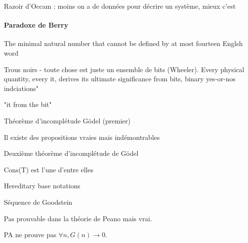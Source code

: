 \begin{definition}
Razoir d'Occam : moins on a de données pour décrire un système, mieux c'est
\end{definition}


\paragraph{Paradoxe de Berry} The minimal natural number that cannot be defined by at most fourteen Englsh word
\begin{definition}
Trous noirs - toute chose est juste un ensemble de bits (Wheeler). Every physical quantity, every it, derives its ultimate significance from bits, binary yes-or-nos indciations"
\par "it from the bit"
\end{definition}

\begin{theorem}
Théorème d'incomplétude Gödel (premier)
\par Il existe des propositions vraies mais indémontrables
\end{theorem}

\begin{theorem}
Deuxième théorème d'incomplétude de Gödel
\par Cons(T) est l'une d'entre elles
\end{theorem}

\begin{definition}
Hereditary base notations
\par Séquence de Goodstein
\end{definition}

\par Pas prouvable dans la théorie de Peano mais vrai.

\begin{theorem}
PA ne prouve pas $\forall n, G(n) \rightarrow 0$.
\end{theorem}